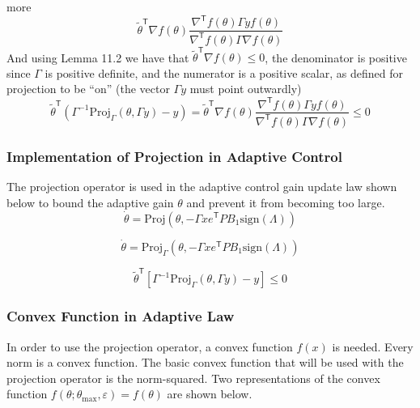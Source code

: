 more
\begin{equation*}
  \tilde{\theta}^{\mathsf{T}}\nabla f(\theta)\frac{{\nabla}^{\mathsf{T}}f(\theta)\Gamma yf(\theta)}{\nabla^{\mathsf{T}}f(\theta)\Gamma \nabla f(\theta)}
\end{equation*}
And using Lemma 11.2 we have that $\tilde{\theta}^{\mathsf{T}}\nabla f(\theta)\leq0$, the denominator is positive since $\Gamma$ is positive definite, and the numerator is a positive scalar, as defined for projection to be ``on'' (the vector $\Gamma y$ must point outwardly)
\begin{equation*}
  \tilde{\theta}^{\mathsf{T}}\left(\Gamma^{-1}\text{Proj}_{\Gamma}(\theta,\Gamma y)-y\right)=
  \tilde{\theta}^{\mathsf{T}}\nabla f(\theta)\frac{{\nabla}^{\mathsf{T}}f(\theta)\Gamma yf(\theta)}{\nabla^{\mathsf{T}}f(\theta)\Gamma \nabla f(\theta)}\leq0
\end{equation*}

\subsubsection{Implementation of Projection in Adaptive Control}

The projection operator is used in the adaptive control gain update law shown below to bound the adaptive gain $\theta$ and prevent it from becoming too large.
\begin{equation*}
  \dot{\theta}=\text{Proj}(\theta,-\Gamma xe^{\mathsf{T}}PB_{1}\text{sign}(\Lambda))
\end{equation*}

\begin{equation*}
  \dot{\theta}=\text{Proj}_{\Gamma}(\theta,-\Gamma xe^{\mathsf{T}}PB_{1}\text{sign}(\Lambda))
\end{equation*}

\begin{equation*}
  \tilde{\theta}^{\mathsf{T}}[\Gamma^{-1}\text{Proj}_{\Gamma}(\theta,\Gamma y)-y]\leq0
\end{equation*}

\subsubsection{Convex Function in Adaptive Law}

In order to use the projection operator, a convex function $f(x)$ is needed.
Every norm is a convex function.
The basic convex function that will be used with the projection operator is the norm-squared.
Two representations of the convex function $f(\theta;{\theta_{\text{max}}},\varepsilon)=f(\theta)$ are shown below.

